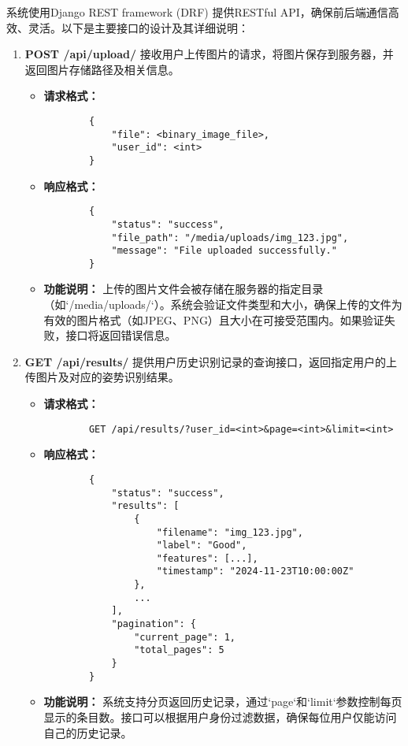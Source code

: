 系统使用Django REST framework (DRF) 提供RESTful API，确保前后端通信高效、灵活。以下是主要接口的设计及其详细说明：

\begin{enumerate}
    \item \textbf{POST /api/upload/}
    接收用户上传图片的请求，将图片保存到服务器，并返回图片存储路径及相关信息。
    \begin{itemize}
        \item \textbf{请求格式：}
        \begin{lstlisting}
        {
            "file": <binary_image_file>,
            "user_id": <int>
        }
        \end{lstlisting}
        \item \textbf{响应格式：}
        \begin{lstlisting}
        {
            "status": "success",
            "file_path": "/media/uploads/img_123.jpg",
            "message": "File uploaded successfully."
        }
        \end{lstlisting}
        \item \textbf{功能说明：}
        上传的图片文件会被存储在服务器的指定目录（如`/media/uploads/`）。系统会验证文件类型和大小，确保上传的文件为有效的图片格式（如JPEG、PNG）且大小在可接受范围内。如果验证失败，接口将返回错误信息。

    \end{itemize}

    \item \textbf{GET /api/results/}
    提供用户历史识别记录的查询接口，返回指定用户的上传图片及对应的姿势识别结果。
    \begin{itemize}
        \item \textbf{请求格式：}
        \begin{lstlisting}
        GET /api/results/?user_id=<int>&page=<int>&limit=<int>
        \end{lstlisting}
        \item \textbf{响应格式：}
        \begin{lstlisting}
        {
            "status": "success",
            "results": [
                {
                    "filename": "img_123.jpg",
                    "label": "Good",
                    "features": [...],
                    "timestamp": "2024-11-23T10:00:00Z"
                },
                ...
            ],
            "pagination": {
                "current_page": 1,
                "total_pages": 5
            }
        }
        \end{lstlisting}
        \item \textbf{功能说明：}
        系统支持分页返回历史记录，通过`page`和`limit`参数控制每页显示的条目数。接口可以根据用户身份过滤数据，确保每位用户仅能访问自己的历史记录。


\end{itemize}
\end{enumerate}
